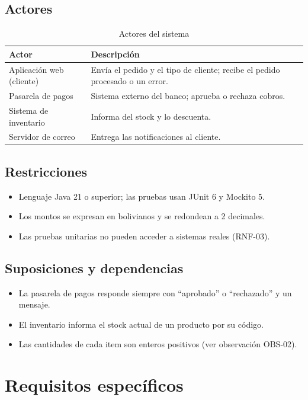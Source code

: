 \documentclass[11pt,a4paper,oneside]{report}
\begin{document}
\subsection{Actores}
\begin{table}[H]
\centering
\caption{Actores del sistema}
\begin{tabularx}{\linewidth}{lX}
\toprule
\textbf{Actor} & \textbf{Descripción}\\
\midrule
Aplicación web (cliente) & Envía el pedido y el tipo de cliente; recibe el pedido procesado o un error.\\
Pasarela de pagos & Sistema externo del banco; aprueba o rechaza cobros.\\
Sistema de inventario & Informa del stock y lo descuenta.\\
Servidor de correo & Entrega las notificaciones al cliente.\\
\bottomrule
\end{tabularx}
\end{table}

\subsection{Restricciones}
\begin{itemize}
  \item Lenguaje Java 21 o superior; las pruebas usan JUnit 6 y Mockito 5.
  \item Los montos se expresan en bolivianos y se redondean a 2 decimales.
  \item Las pruebas unitarias no pueden acceder a sistemas reales (RNF-03).
\end{itemize}

\subsection{Suposiciones y dependencias}
\begin{itemize}
  \item La pasarela de pagos responde siempre con ``aprobado'' o ``rechazado'' y un mensaje.
  \item El inventario informa el stock actual de un producto por su código.
  \item Las cantidades de cada item son enteros positivos (ver observación OBS-02).
\end{itemize}

\section{Requisitos específicos}
\end{document}
